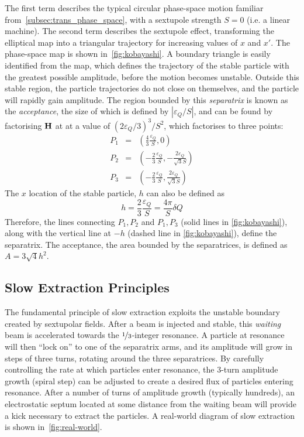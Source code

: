 \documentclass[a4paper,twoside,11pt]{report}
\begin{document}
The first term describes the typical circular phase-space motion familiar from~\autoref{subsec:trans_phase_space}, with a sextupole strength $S=0$ (i.e. a linear machine). The second term describes the sextupole effect, transforming the elliptical map into a triangular trajectory for increasing values of $x$ and $x'$. The phase-space map is shown in~\autoref{fig:kobayashi}. A boundary triangle is easily identified from the map, which defines the trajectory of the stable particle with the greatest possible amplitude, before the motion becomes unstable. Outside this stable region, the particle trajectories do not close on themselves, and the particle will rapidly gain amplitude. The region bounded by this \textit{separatrix} is known as the \textit{acceptance}, the size of which is defined by $|{\varepsilon_Q} /S|$, and can be found by factorising $\bf H$ at at a value of $(2{\varepsilon_Q} /3)^3/S^2$, which factorises to three points:
\begin{eqnarray}
  P_1 &=& \left(\frac 43 \frac{\varepsilon_Q} S,    0                       \right) \\
  P_2 &=& \left(-\frac 23 \frac {\varepsilon_Q} S,  -\frac{2{\varepsilon_Q}}{\sqrt 3 S} \right) \\
  P_3 &=& \left(-\frac 23 \frac {\varepsilon_Q} S,  \frac{2{\varepsilon_Q}}{\sqrt 3 S} \right)
\end{eqnarray}
The $x$ location of the stable particle, $h$ can also be defined as
\begin{equation}
  h=\frac 23 \frac {\varepsilon_Q} S = \frac{4\pi}S\delta Q
  \label{eq:apothem}
\end{equation}
Therefore, the lines connecting $P_1, P_2$ and $P_1, P_3$ (solid lines in \autoref{fig:kobayashi}), along with the vertical line at $-h$ (dashed line in \autoref{fig:kobayashi}), define the separatrix. The acceptance, the area bounded by the separatrices, is defined as $A=3\sqrt 4 h^2$.

\subsection{Slow Extraction Principles}
The fundamental principle of slow extraction exploits the unstable boundary created by sextupolar fields. After a beam is injected and stable, this \textit{waiting} beam is accelerated towards the $\nicefrac 13$-integer resonance. A particle at resonance will then ``lock on'' to one of the separatrix arms, and its amplitude will grow in steps of three turns, rotating around the three separatrices. By carefully controlling the rate at which particles enter resonance, the 3-turn amplitude growth (spiral step) can be adjusted to create a desired flux of particles entering resonance. After a number of turns of amplitude growth (typically hundreds), an electrostatic septum located at some distance from the waiting beam will provide a kick necessary to extract the particles. A real-world diagram of slow extraction is shown in~\autoref{fig:real-world}.
\end{document}
